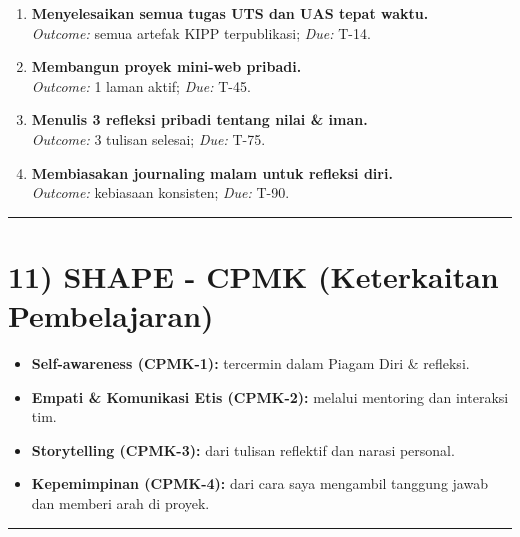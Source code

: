 \documentclass[
  letterpaper,
  DIV=11,
  numbers=noendperiod]{scrreprt}
\providecommand{\tightlist}{%
  \setlength{\itemsep}{0pt}\setlength{\parskip}{0pt}}
\begin{document}
\begin{enumerate}
\def\labelenumi{\arabic{enumi}.}
\tightlist
\item
  \textbf{Menyelesaikan semua tugas UTS dan UAS tepat waktu.}\\
  \emph{Outcome:} semua artefak KIPP terpublikasi; \emph{Due:} T-14.\\
\item
  \textbf{Membangun proyek mini-web pribadi.}\\
  \emph{Outcome:} 1 laman aktif; \emph{Due:} T-45.\\
\item
  \textbf{Menulis 3 refleksi pribadi tentang nilai \& iman.}\\
  \emph{Outcome:} 3 tulisan selesai; \emph{Due:} T-75.\\
\item
  \textbf{Membiasakan journaling malam untuk refleksi diri.}\\
  \emph{Outcome:} kebiasaan konsisten; \emph{Due:} T-90.
\end{enumerate}

\begin{center}\rule{0.5\linewidth}{0.5pt}\end{center}

\section{11) SHAPE - CPMK (Keterkaitan
Pembelajaran)}\label{shape---cpmk-keterkaitan-pembelajaran}

\begin{itemize}
\tightlist
\item
  \textbf{Self-awareness (CPMK-1):} tercermin dalam Piagam Diri \&
  refleksi.\\
\item
  \textbf{Empati \& Komunikasi Etis (CPMK-2):} melalui mentoring dan
  interaksi tim.\\
\item
  \textbf{Storytelling (CPMK-3):} dari tulisan reflektif dan narasi
  personal.\\
\item
  \textbf{Kepemimpinan (CPMK-4):} dari cara saya mengambil tanggung
  jawab dan memberi arah di proyek.
\end{itemize}

\begin{center}\rule{0.5\linewidth}{0.5pt}\end{center}
\end{document}
